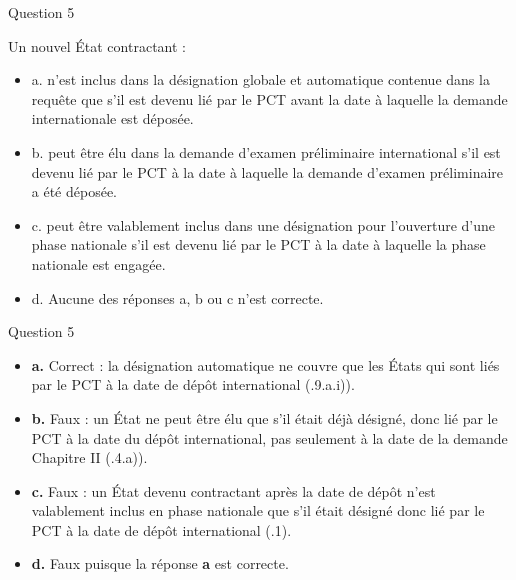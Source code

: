 \begin{frame}{Question 5}

\begin{block}{}
Un nouvel État contractant :

\begin{itemize}
  \item[$\bullet$] a. n’est inclus dans la désignation globale et automatique contenue dans la requête 
  que s’il est devenu lié par le PCT avant la date à laquelle la demande internationale 
  est déposée. 
  \item[$\circ$] b. peut être élu dans la demande d’examen préliminaire international s’il est devenu lié 
  par le PCT à la date à laquelle la demande d’examen préliminaire a été déposée. 
  \item[$\circ$] c. peut être valablement inclus dans une désignation pour l’ouverture d’une phase 
  nationale s’il est devenu lié par le PCT à la date à laquelle la phase nationale est 
  engagée. 
  \item[$\circ$] d. Aucune des réponses a, b ou c n’est correcte.
\end{itemize}

\end{block}

\end{frame}

\begin{frame}{Question 5}

\begin{itemize}
  \item[$\bullet$] \textbf{a.} \; Correct : la désignation automatique ne couvre que les États
  qui sont liés par le PCT à la date de dépôt international
  (.9.a.i)).

  \item[$\circ$] \textbf{b.} \; Faux : un État ne peut être élu que s’il était déjà désigné,
  donc lié par le PCT à la date du dépôt international, pas seulement à la date de la demande
  Chapitre II (.4.a)).

  \item[$\circ$] \textbf{c.} \; Faux : un État devenu contractant après la date de dépôt
  n’est valablement inclus en phase nationale que s'il était désigné donc lié
  par le PCT à la date de dépôt international (.1).

  \item[$\circ$] \textbf{d.} \; Faux puisque la réponse \textbf{a} est correcte.
\end{itemize}

\end{frame}
